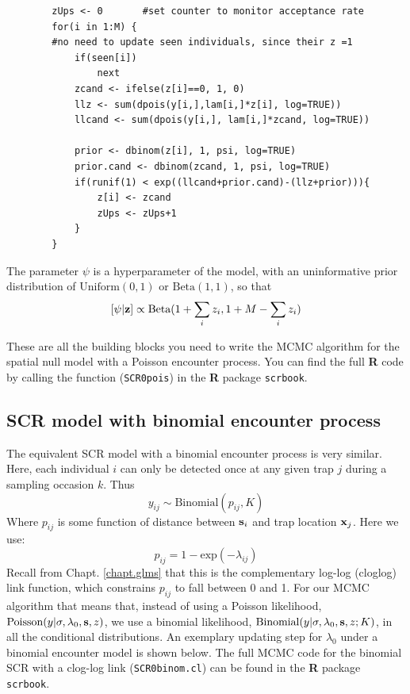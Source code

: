 \begin{verbatim}
        zUps <- 0		#set counter to monitor acceptance rate
        for(i in 1:M) {
        #no need to update seen individuals, since their z =1
            if(seen[i])
                next
            zcand <- ifelse(z[i]==0, 1, 0)
            llz <- sum(dpois(y[i,],lam[i,]*z[i], log=TRUE))
            llcand <- sum(dpois(y[i,], lam[i,]*zcand, log=TRUE))

            prior <- dbinom(z[i], 1, psi, log=TRUE)
            prior.cand <- dbinom(zcand, 1, psi, log=TRUE)
            if(runif(1) < exp((llcand+prior.cand)-(llz+prior))){
                z[i] <- zcand
                zUps <- zUps+1
            }
        }
\end{verbatim}
The parameter $\psi$ is a hyperparameter of the model, with an uninformative prior
 distribution of $\mbox{Uniform}(0,1)$ or $\mbox{Beta}(1,1)$, so that
\[
[\psi|{\bf z}] \propto \mbox{Beta}(1 + \sum_i z_i, 1 + M-\sum_i z_i)
\]


These are all the building blocks you need to write the MCMC algorithm
for the spatial null model with a Poisson encounter process.  You can
find the full {\bf R} code by calling the function (\mbox{\tt SCR0pois}) in the {\bf R} package
\mbox{\tt scrbook}.

\subsection{SCR model with binomial encounter process}
The equivalent SCR model with a binomial encounter process is very
similar. Here, each individual $i$ can only be detected once at any
given trap $j$ during a sampling occasion $k$.  Thus
\[
y_{ij} \sim \mbox{Binomial} (p_{ij}, K)
\]
Where $p_{ij}$ is some function of distance between ${\bf s}_{i}$ and trap location ${\bf x}_{j}$. Here we use:
\[
p_{ij}=1-\mbox{exp}(-\lambda_{ij})
\]
Recall from Chapt. \ref{chapt.glms} that this is the complementary log-log (cloglog) link function, which constrains $p_{ij}$
to fall between 0 and 1.
For our MCMC algorithm that means that, instead of using a Poisson
likelihood, $\mbox{Poisson}(y|\sigma,\lambda_0,{\bf s},z)$, we use a
binomial likelihood, $\mbox{Binomial}(y| \sigma,\lambda_0,{\bf s},z; K)$,
in all the conditional distributions. An exemplary updating step for $\lambda_0$ under a binomial encounter model is shown below.
The full MCMC code for the binomial SCR with a clog-log link (\mbox{\tt SCR0binom.cl})
can be found in the {\bf R} package \mbox{\tt scrbook}.

